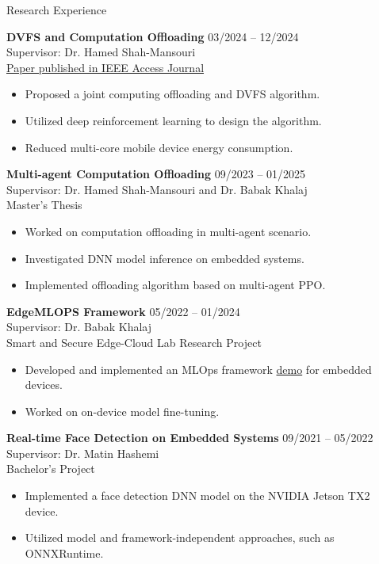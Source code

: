 \documentclass{resume} %
\begin{document}
\begin{rSection}{Research Experience}
\vspace{-1.25em}
\item \textbf{DVFS and Computation Offloading} \hfill {03/2024 -- 12/2024} \\
Supervisor: Dr. Hamed Shah-Mansouri \\ 
\href{https://ieeexplore.ieee.org/document/11267461}{Paper published in IEEE Access Journal}
\vspace{-5pt}
\begin{itemize}
    \itemsep -3pt {} 
        \item Proposed a joint computing offloading and DVFS algorithm.
        \item Utilized deep reinforcement learning to design the algorithm.
        \item Reduced multi-core mobile device energy consumption.
\end{itemize}
\item \textbf{Multi-agent Computation Offloading} \hfill {09/2023 -- 01/2025} \\
Supervisor: Dr. Hamed Shah-Mansouri and Dr. Babak Khalaj \\
Master's Thesis
\vspace{-5pt}
\begin{itemize}
    \itemsep -3pt {} 
        \item Worked on computation offloading in multi-agent scenario.
        \item Investigated DNN model inference on embedded systems.
        \item Implemented offloading algorithm based on multi-agent PPO.
\end{itemize}
\item \textbf{EdgeMLOPS Framework} \hfill {05/2022 -- 01/2024} \\
Supervisor: Dr. Babak Khalaj \\
Smart and Secure Edge-Cloud Lab Research Project
\vspace{-5pt}
\begin{itemize}
    \itemsep -3pt {} 
        \item Developed and implemented an MLOps framework \href{https://github.com/Sharif-Smart-and-Secure-Edge-Cloud-Lab/edge-mlops}{demo} for embedded devices.
        \item Worked on on-device model fine-tuning.
\end{itemize}
\item \textbf{Real-time Face Detection on Embedded Systems} \hfill {09/2021 -- 05/2022} \\
Supervisor: Dr. Matin Hashemi \\
Bachelor's Project
\vspace{-5pt}
\begin{itemize}
    \itemsep -3pt {}
        \item Implemented a face detection DNN model on the NVIDIA Jetson TX2 device.
        \item Utilized model and framework-independent approaches, such as ONNXRuntime.
\end{itemize}
\end{rSection} 
\end{document}
